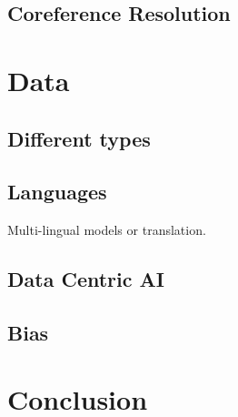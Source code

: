 \subsection{Coreference Resolution}


\section{Data}
\subsection{Different types}
\subsection{Languages} Multi-lingual models or translation.
\subsection{Data Centric AI}
\subsection{Bias}

\section{Conclusion}